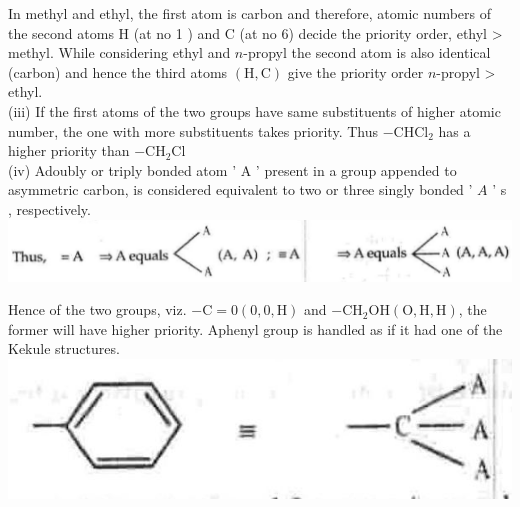 \documentclass[10pt]{article}
\begin{document}
In methyl and ethyl, the first atom is carbon and therefore, atomic numbers of the second atoms H (at no 1 ) and C (at no 6) decide the priority order, ethyl > methyl. While considering ethyl and $n$-propyl the second atom is also identical (carbon) and hence the third atoms $(\mathrm{H}, \mathrm{C})$ give the priority order $n$-propyl > ethyl.\\
(iii) If the first atoms of the two groups have same substituents of higher atomic number, the one with more substituents takes priority. Thus $-\mathrm{CHCl}_{2}$ has a higher priority than $-\mathrm{CH}_{2} \mathrm{Cl}$\\
(iv) Adoubly or triply bonded atom ' A ' present in a group appended to asymmetric carbon, is considered equivalent to two or three singly bonded ' $A$ ' s , respectively.\\
\includegraphics[max width=\textwidth, center]{2025_01_28_8470952b98110cec3aabg-053(1)}

Hence of the two groups, viz. $-\mathrm{C}=0(0,0, \mathrm{H})$ and $-\mathrm{CH}_{2} \mathrm{OH}(\mathrm{O}, \mathrm{H}, \mathrm{H})$, the former will have higher priority. Aphenyl group is handled as if it had one of the Kekule structures.\\
\includegraphics[max width=\textwidth, center]{2025_01_28_8470952b98110cec3aabg-053}
\end{document}
